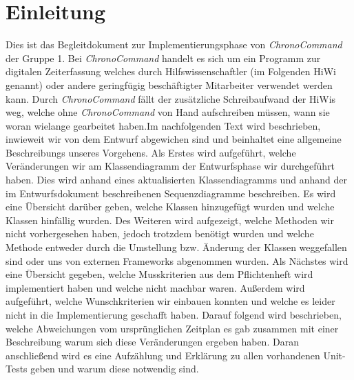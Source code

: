 \section{Einleitung}

Dies ist das Begleitdokument zur Implementierungsphase von \emph{ChronoCommand} der Gruppe 1. Bei \emph{ChronoCommand} handelt
es sich um ein Programm zur digitalen Zeiterfassung welches durch Hilfswissenschaftler (im Folgenden HiWi genannt) oder andere
geringfügig beschäftigter Mitarbeiter verwendet werden kann. Durch \emph{ChronoCommand} fällt der zusätzliche Schreibaufwand der HiWis weg, welche ohne
\emph{ChronoCommand} von Hand aufschreiben müssen, wann sie woran wielange gearbeitet haben.Im nachfolgenden Text wird 
beschrieben, inwieweit wir von dem Entwurf abgewichen sind und beinhaltet eine allgemeine Beschreibungs unseres Vorgehens.
Als Erstes wird aufgeführt, welche Veränderungen wir am Klassendiagramm der Entwurfsphase wir durchgeführt haben. 
Dies wird anhand eines aktualisierten Klassendiagramms und anhand der im Entwurfsdokument beschreibenen Sequenzdiagramme 
beschreiben. Es wird eine Übersicht darüber geben, welche Klassen hinzugefügt wurden und welche Klassen hinfällig wurden. Des 
Weiteren wird aufgezeigt, welche Methoden wir nicht vorhergesehen haben, jedoch trotzdem benötigt wurden und welche Methode 
entweder durch die Umstellung bzw. Änderung der Klassen weggefallen sind oder uns von externen Frameworks abgenommen wurden.
Als Nächstes wird eine Übersicht gegeben, welche Musskriterien aus dem Pflichtenheft wird implementiert haben und welche nicht
machbar waren. Außerdem wird aufgeführt, welche Wunschkriterien wir einbauen konnten und welche es leider nicht in die 
Implementierung geschafft haben. Darauf folgend wird beschrieben, welche Abweichungen vom ursprünglichen Zeitplan es gab 
zusammen mit einer Beschreibung warum sich diese Veränderungen ergeben haben. Daran anschließend wird es eine 
Aufzählung und Erklärung zu allen vorhandenen Unit-Tests geben und warum diese notwendig sind.
